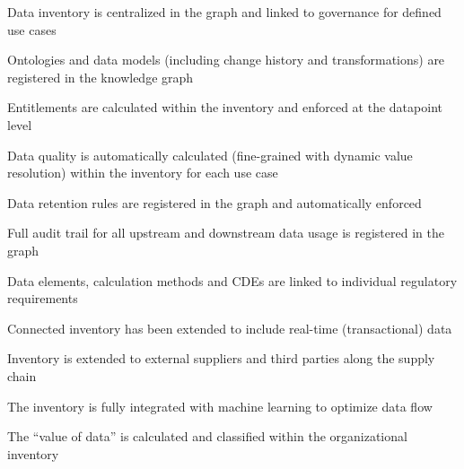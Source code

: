 \kgmmscoringlevelThree

\begin{scoring}

  \item Data inventory is centralized in the graph and linked to governance for defined use cases
  \item Ontologies and data models (including change history and transformations) are registered in the knowledge graph
  \item Entitlements are calculated within the inventory and enforced at the datapoint level
  \item Data quality is automatically calculated (fine-grained with dynamic value resolution) within the inventory
        for each use case
  \item Data retention rules are registered in the graph and automatically enforced
  \item Full audit trail for all upstream and downstream data usage is registered in the graph
  \item Data elements, calculation methods and CDEs are linked to individual regulatory requirements

\end{scoring}

\kgmmscoringlevelFour

\begin{scoring}

  \item Connected inventory has been extended to include real-time (transactional) data
  \item Inventory is extended to external suppliers and third parties along the supply chain
  \item The inventory is fully integrated with machine learning to optimize data flow
  \item The “value of data” is calculated and classified within the organizational inventory

\end{scoring}

